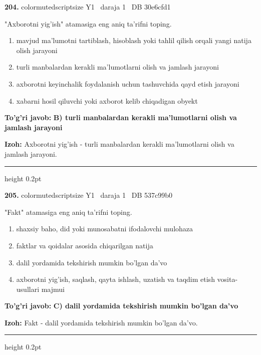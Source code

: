 \documentclass[10pt,a4paper,oneside]{article}
\begin{document}
\noindent\textbf{\color{ink}204.}  {color{muted}scriptsize Y1 \textbullet\ daraja 1 \textbullet\ DB 30e6cfd1}
\par
"Axborotni yig'ish" atamasiga eng aniq ta'rifni toping.
\begin{enumerate}[label=\Alph*),leftmargin=9mm]
\item mavjud ma'lumotni tartiblash, hisoblash yoki tahlil qilish orqali yangi natija olish jarayoni
\item turli manbalardan kerakli ma'lumotlarni olish va jamlash jarayoni
\item axborotni keyinchalik foydalanish uchun tashuvchida qayd etish jarayoni
\item xabarni hosil qiluvchi yoki axborot kelib chiqadigan obyekt
\end{enumerate}
\begin{tcolorbox}[enhanced,breakable,colback=teal!4,colframe=teal!50!black,boxrule=0.5pt,arc=1.1mm,left=3mm,right=3mm,top=1.7mm,bottom=1.7mm,before skip=2mm,after skip=2mm]
\textbf{\color{teal}To'g'ri javob:} \textbf{B) turli manbalardan kerakli ma'lumotlarni olish va jamlash jarayoni}
\par\smallskip
\textbf{Izoh:} Axborotni yig'ish - turli manbalardan kerakli ma'lumotlarni olish va jamlash jarayoni.
\end{tcolorbox}
\vspace{2mm}\hrule height 0.2pt \vspace{3mm}

\noindent\textbf{\color{ink}205.}  {color{muted}scriptsize Y1 \textbullet\ daraja 1 \textbullet\ DB 537c99b0}
\par
"Fakt" atamasiga eng aniq ta'rifni toping.
\begin{enumerate}[label=\Alph*),leftmargin=9mm]
\item shaxsiy baho, did yoki munosabatni ifodalovchi mulohaza
\item faktlar va qoidalar asosida chiqarilgan natija
\item dalil yordamida tekshirish mumkin bo'lgan da'vo
\item axborotni yig'ish, saqlash, qayta ishlash, uzatish va taqdim etish vosita-usullari majmui
\end{enumerate}
\begin{tcolorbox}[enhanced,breakable,colback=teal!4,colframe=teal!50!black,boxrule=0.5pt,arc=1.1mm,left=3mm,right=3mm,top=1.7mm,bottom=1.7mm,before skip=2mm,after skip=2mm]
\textbf{\color{teal}To'g'ri javob:} \textbf{C) dalil yordamida tekshirish mumkin bo'lgan da'vo}
\par\smallskip
\textbf{Izoh:} Fakt - dalil yordamida tekshirish mumkin bo'lgan da'vo.
\end{tcolorbox}
\vspace{2mm}\hrule height 0.2pt \vspace{3mm}
\end{document}
